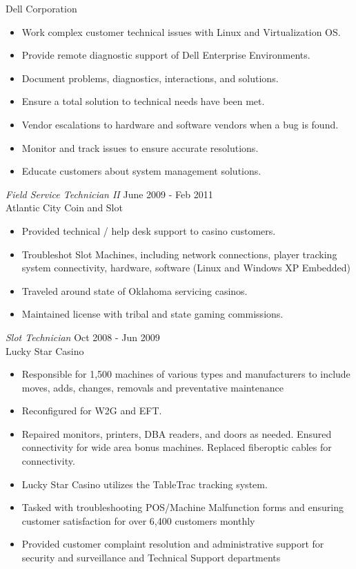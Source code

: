 \documentclass[margin]{res}
\begin{document}
\begin{resume}
 	Dell Corporation
 	\begin{itemize}  \itemsep -2pt %
 		\item Work complex customer technical issues with Linux and Virtualization OS.
 		\item Provide remote diagnostic support of Dell Enterprise Environments.
 		\item Document problems, diagnostics, interactions, and solutions.
 		\item Ensure a total solution to technical needs have been met.
 		\item Vendor escalations to hardware and software vendors when a bug is found.
 		\item Monitor and track issues to ensure accurate resolutions.
 		\item Educate customers about system management solutions.
 	\end{itemize}
 	{\sl Field Service Technician II} \hfill June 2009 - Feb 2011 \\
 	Atlantic City Coin and Slot
 	\begin{itemize}  \itemsep -2pt %
 		\item Provided technical / help desk support to casino customers.
 		\item Troubleshot Slot Machines, including network connections, player tracking system connectivity, hardware, software (Linux and Windows XP Embedded)
 		\item Traveled around state of Oklahoma servicing casinos.
 		\item Maintained license with tribal and state gaming commissions.
 	\end{itemize} 	
 	 	{\sl Slot Technician} \hfill Oct 2008 - Jun 2009 \\
 	Lucky Star Casino
 	\begin{itemize}  \itemsep -2pt %
 		\item Responsible for 1,500 machines of various types and manufacturers to include moves, adds, changes, removals and preventative maintenance 
 		\item Reconfigured for W2G and EFT. 
 		\item Repaired monitors, printers, DBA readers, and doors as needed. Ensured connectivity for wide area bonus machines. Replaced fiberoptic cables for connectivity.  
 		\item Lucky Star Casino utilizes the TableTrac tracking system.
 		\item Tasked with troubleshooting POS/Machine Malfunction forms and ensuring customer satisfaction for over 6,400 customers monthly
 		\item Provided customer complaint resolution and administrative support for security and surveillance and Technical Support departments
 	\end{itemize} 	
 	
\end{resume}
\end{document}
